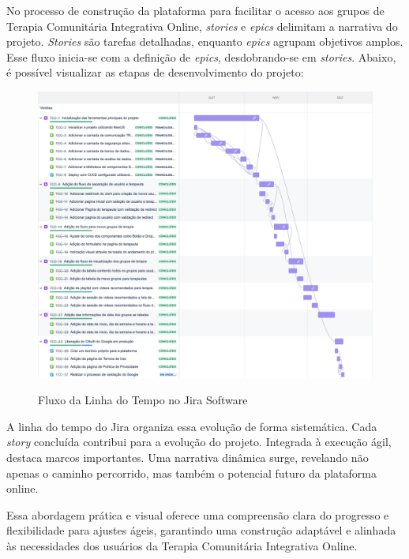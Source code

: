     No processo de construção da plataforma para facilitar o acesso aos grupos de Terapia Comunitária Integrativa Online, \textit{stories} e \textit{epics} delimitam a narrativa do projeto. \textit{Stories} são tarefas detalhadas, enquanto \textit{epics} agrupam objetivos amplos. Esse fluxo inicia-se com a definição de \textit{epics}, desdobrando-se em \textit{stories}. Abaixo, é possível visualizar as etapas de desenvolvimento do projeto:\\
\begin{figure}[!ht]
    \centering
    \includegraphics[scale=0.16]{latex/figuras/fluxojira.pdf}
    \label{fluxojira}
    \caption[Fluxo de Desenvolvimento do Projeto]{Fluxo da Linha do Tempo no Jira Software}
    \label{fig:enter-label}
\end{figure}\pagebreak

    A linha do tempo do Jira organiza essa evolução de forma sistemática.
    Cada \textit{story} concluída contribui para a evolução do projeto. Integrada à execução ágil, destaca marcos importantes. Uma narrativa dinâmica surge, revelando não apenas o caminho percorrido, mas também o potencial futuro da plataforma online.

    Essa abordagem prática e visual oferece uma compreensão clara do progresso e flexibilidade para ajustes ágeis, garantindo uma construção adaptável e alinhada às necessidades dos usuários da Terapia Comunitária Integrativa Online.

    




